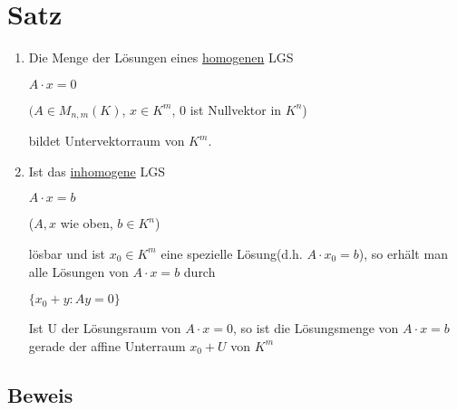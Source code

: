 \documentclass[a4paper, openany]{book}
\begin{document}
    \section{Satz}

    \begin{enumerate}[label=(\alph*)]
      \item Die Menge der Lösungen eines \underline{homogenen} LGS

      \begin{center}
        $A \cdot x = 0$
      \end{center}

      $(A \in M_{n,m}(K)$, $x \in K^m$, 0 ist Nullvektor in $K^n$)

      bildet Untervektorraum  von $K^m$.

      \item Ist das \underline{inhomogene} LGS

      \begin{center}
        $A \cdot x = b$
      \end{center}

      ($A,x$ wie oben, $b \in K^n$)

      lösbar und ist $x_0 \in K^m$ eine spezielle Lösung(d.h. $A \cdot x_0 = b$), so erhält man alle Lösungen von $A \cdot x = b$ durch

      \begin{center}
        $\{x_0 + y : Ay = 0 \}$
      \end{center}

      Ist U der Lösungsraum von $A \cdot x = 0$, so ist die Lösungsmenge von $A \cdot x = b$ gerade der affine Unterraum $x_0 + U$ von $K^m$
    \end{enumerate}

    \subsection{Beweis}
\end{document}
